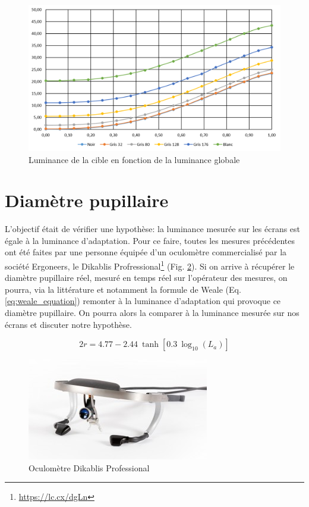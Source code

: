 	\begin{figure}
		\centering
		\includegraphics[scale=.75]{Figures/EvolutionLuminanceTarget}
		\caption{Luminance de la cible en fonction de la luminance globale}
		\label{fig:evolution_luminance_target}
	\end{figure}
	
	\section{Diamètre pupillaire}
	\par L'objectif était de vérifier une hypothèse: la luminance mesurée sur les écrans est égale à la luminance d'adaptation. Pour ce faire, toutes les mesures précédentes ont été faites par une personne équipée d'un oculomètre commercialisé par la société Ergoneers, le Dikablis Profressional\footnote{\url{https://lc.cx/dgLn}} (Fig. \ref{fig:dikablis_pro}). Si on arrive à récupérer le diamètre pupillaire réel, mesuré en temps réel sur l'opérateur des mesures, on pourra, via la littérature et notamment la formule de Weale (Eq. \ref{eq:weale_equation}) remonter à la luminance d'adaptation qui provoque ce diamètre pupillaire. On pourra alors la comparer à la luminance mesurée sur nos écrans et discuter notre hypothèse.
	
	\begin{equation}
		2r = 4.77 - 2.44~\tanh[0.3~\log_{10}(L_a)]
		\label{eq:weale_equation}
	\end{equation}
	
	\begin{figure}
		\centering
		\includegraphics[scale=1]{Figures/DikablisProfessional}
		\caption{Oculomètre Dikablis Professional}
		\label{fig:dikablis_pro}
	\end{figure}
	
